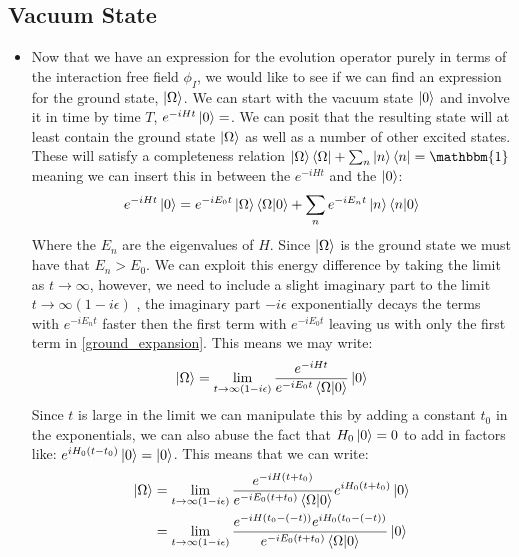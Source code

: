 \documentclass[11pt]{article}
\numberwithin{equation}{section}
\begin{document}
\subsection{Vacuum State} %
\label{sub:vacuum_state}
\begin{itemize}
  \item Now that we have an expression for the evolution operator purely in terms of the interaction free field $\phi_I$, we would like to see if we can find an expression for the ground state, $\ket{\Omega}$. We can start with the vacuum state $\ket{0}$ and involve it in time by time $T$, $e^{-iHt}\ket{0}=$. We can posit that the resulting state will at least contain the ground state $\ket{\Omega}$ as well as a number of other excited states. These will satisfy a completeness relation $\ket{\Omega}\bra{\Omega} + \sum_{n}\ket{n}\bra{n} = \mathbbm{1}$ meaning we can insert this in between the $e^{-iHt}$ and the $\ket{0}$:
  \begin{align}
  \label{ground_expansion}
    e^{-iHt}\ket{0}=e^{-iE_0t}\ket{\Omega}\braket{\Omega|0} + \sum_{n}e^{-iE_nt}\ket{n}\braket{n|0}
  \end{align}
  Where the $E_n$ are the eigenvalues of $H$. Since $\ket{\Omega}$ is the ground state we must have that $E_n>E_0$. We can exploit this energy difference by taking the limit as $t \rightarrow \infty$, however, we need to include a slight imaginary part to the limit $t \rightarrow \infty(1-i\epsilon)$ , the imaginary part $-i\epsilon$ exponentially decays the terms with $e^{-iE_nt}$ faster then the first term with $e^{-iE_0t}$  leaving us with only the first term in \ref{ground_expansion}. This means we may write:
  \begin{align}
  \label{ground_state}
    \ket{\Omega} = \lim_{t\rightarrow\infty(1-i\epsilon)}\frac{e^{-iHt}}{e^{-iE_0t}\braket{\Omega|0}}\ket{0}
  \end{align}
  Since $t$ is large in the limit we can manipulate this by adding a constant $t_0$ in the exponentials, we can also abuse the fact that $H_0\ket{0} = 0$ to add in factors like: $e^{iH_0(t-t_0)}\ket{0} = \ket{0}$. This means that we can write:
  \begin{align*}
    \ket{\Omega} & = \lim_{t\rightarrow\infty(1-i\epsilon)}\frac{e^{-iH(t+t_0)}}{e^{-iE_0(t+t_0)}\braket{\Omega|0}}e^{iH_0(t+t_0)}\ket{0} \\
    & =  \lim_{t\rightarrow\infty(1-i\epsilon)}\frac{e^{-iH(t_0-(-t))}e^{iH_0(t_0-(-t))}}{e^{-iE_0(t+t_0)}\braket{\Omega|0}}\ket{0} \\

\end{align*}
\end{itemize}
\end{document}
